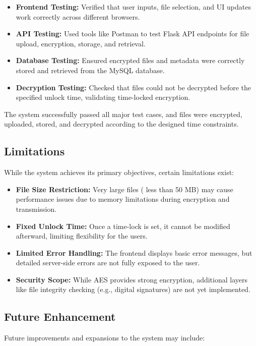 \documentclass[12pt]{article}
\begin{document}
\begin{itemize}
    \item \textbf{Frontend Testing:} Verified that user inputs, file selection, and UI updates work correctly across different browsers.
    \item \textbf{API Testing:} Used tools like Postman to test Flask API endpoints for file upload, encryption, storage, and retrieval.
    \item \textbf{Database Testing:} Ensured encrypted files and metadata were correctly stored and retrieved from the MySQL database.
    \item \textbf{Decryption Testing:} Checked that files could not be decrypted before the specified unlock time, validating time-locked encryption.
\end{itemize}

The system successfully passed all major test cases, and files were encrypted, uploaded, stored, and decrypted according to the designed time constraints.

\subsection{Limitations}
While the system achieves its primary objectives, certain limitations exist:

\begin{itemize}
    \item \textbf{File Size Restriction:} Very large files ( less than 50 MB) may cause performance issues due to memory limitations during encryption and transmission.
    \item \textbf{Fixed Unlock Time:} Once a time-lock is set, it cannot be modified afterward, limiting flexibility for the users.
    \item \textbf{Limited Error Handling:} The frontend displays basic error messages, but detailed server-side errors are not fully exposed to the user.
    \item \textbf{Security Scope:} While AES provides strong encryption, additional layers like file integrity checking (e.g., digital signatures) are not yet implemented.
\end{itemize}

\subsection{Future Enhancement}
Future improvements and expansions to the system may include:
\end{document}
